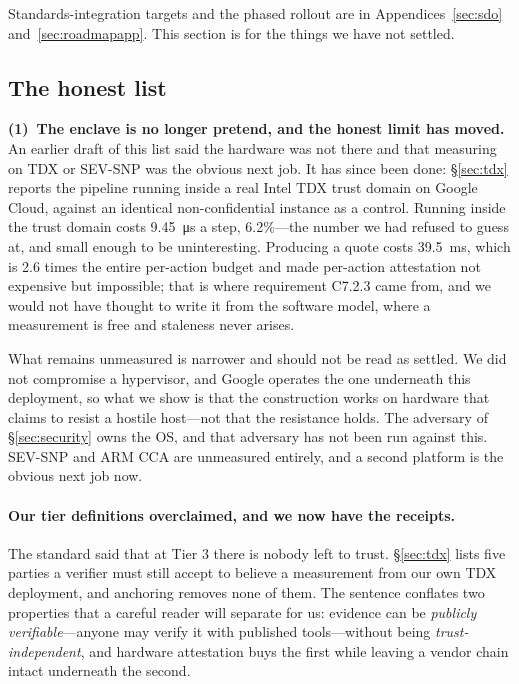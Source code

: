 \documentclass[11pt]{article}
\begin{document}
Standards-integration targets and the phased rollout are in
Appendices~\ref{sec:sdo} and~\ref{sec:roadmapapp}. This section is for the
things we have not settled.

\subsection{The honest list}
\textbf{(1)~The enclave is no longer pretend, and the honest limit has moved.}
An earlier draft of this list said the hardware was not there and that
measuring on TDX or SEV-SNP was the obvious next job. It has since been done:
\S\ref{sec:tdx} reports the pipeline running inside a real Intel TDX trust
domain on Google Cloud, against an identical non-confidential instance as a
control. Running inside the trust domain costs \SI{9.45}{\micro\second} a
step, 6.2\%---the number we had refused to guess at, and small enough to be
uninteresting. Producing a quote costs \SI{39.5}{\milli\second}, which is 2.6
times the entire per-action budget and made per-action attestation not
expensive but impossible; that is where requirement C7.2.3 came from, and we
would not have thought to write it from the software model, where a measurement
is free and staleness never arises.

What remains unmeasured is narrower and should not be read as settled. We did
not compromise a hypervisor, and Google operates the one underneath this
deployment, so what we show is that the construction works on hardware that
claims to resist a hostile host---not that the resistance holds. The adversary
of \S\ref{sec:security} owns the OS, and that adversary has not been run
against this. SEV-SNP and ARM CCA are unmeasured entirely, and a second
platform is the obvious next job now.

\paragraph{Our tier definitions overclaimed, and we now have the receipts.} The
standard said that at Tier 3 there is nobody left to trust. \S\ref{sec:tdx}
lists five parties a verifier must still accept to believe a measurement from
our own TDX deployment, and anchoring removes none of them. The sentence
conflates two properties that a careful reader will separate for us: evidence
can be \emph{publicly verifiable}---anyone may verify it with published
tools---without being \emph{trust-independent}, and hardware attestation buys
the first while leaving a vendor chain intact underneath the second.
\end{document}
